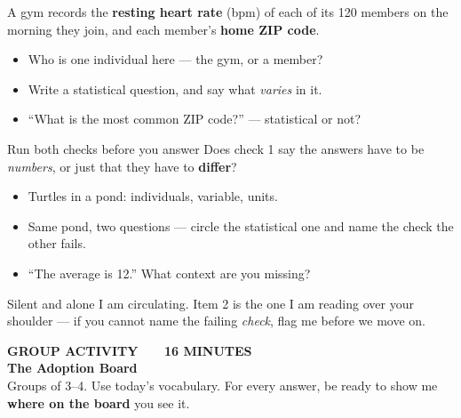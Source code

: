 \documentclass[aspectratio=169, 11pt]{beamer}
\newcommand{\redink}[1]{{\color{redacc}\bfseries #1}}
\begin{document}
\begin{frame}[t, plain]
  A gym records the \textbf{resting heart rate} (bpm) of each of its 120 members on the
  morning they join, and each member's \textbf{home ZIP code}.
  \begin{itemize}\setlength{\itemsep}{5pt}
    \item Who is one individual here --- the gym, or a member?
    \item Write a statistical question, and say what \emph{varies} in it.
    \item ``What is the most common ZIP code?'' --- statistical or not?
  \end{itemize}
  \begin{block}{Run both checks before you answer}
    Does check 1 say the answers have to be \emph{numbers}, or just that they have to
    \redink{differ}?
  \end{block}
\end{frame}

\begin{frame}[t, plain]
  \begin{itemize}\setlength{\itemsep}{7pt}
    \item Turtles in a pond: individuals, variable, units.
    \item Same pond, two questions --- circle the statistical one and name the check the
          other fails.
    \item ``The average is 12.'' What context are you missing?
  \end{itemize}
  \begin{block}{Silent and alone}
    I am circulating. Item 2 is the one I am reading over your shoulder --- if you cannot name
    the failing \emph{check}, flag me before we move on.
  \end{block}
\end{frame}

{
\begin{frame}[plain]
  \vspace{1.8cm}\hspace{0.8cm}%
  \begin{minipage}{0.86\textwidth}
    {\color{goldacc}\bfseries\small GROUP ACTIVITY \ \textbullet\ \ 16 MINUTES}\\[0.7cm]
    {\color{white}\bfseries\Large The Adoption Board}\\[0.9cm]
    {\color{skymid}\small Groups of 3--4. Use today's vocabulary. For every answer, be ready to
    show me \textbf{where on the board} you see it.}
  \end{minipage}
\end{frame}
}
\end{document}
